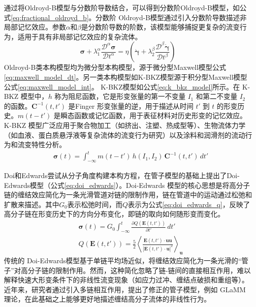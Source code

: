 通过将Oldroyd-B模型与分数阶导数结合，可以得到分数阶Oldroyd-B模型，如公式\eqref{eq:fractional_oldroyd_b}。分数阶 Oldroyd-B模型通过引入分数阶导数描述非局部记忆效应。参数$\alpha$和$\beta$是分数阶导数的阶数，该模型能够捕捉更复杂的流变行为，适用于具有非局部记忆效应的复杂流体。
\begin{equation}
	\boldsymbol{\sigma} + \lambda_1^\alpha \frac{\mathcal{D}^\alpha \boldsymbol{\sigma}}{\mathcal{D}t^\alpha} = \eta \left( \dot{\boldsymbol{\gamma}} + \lambda_2^\beta \frac{\mathcal{D}^\beta \dot{\boldsymbol{\gamma}}}{\mathcal{D}t^\beta} \right) \label{eq:fractional_oldroyd_b}
\end{equation}
Oldroyd-B类本构模型均为微分型本构模型，源于微分型Maxwell模型公式\eqref{eq:maxwell_model_dt}。另一类本构模型如K-BKZ模型源于积分型Maxwell模型公式\eqref{eq:maxwell_model_int}。
K-BKZ模型如公式\eqref{eq:k_bkz_model}所示。在 K-BKZ 模型中，$h$ 称为阻尼函数，它是形变张量的第一不变量 $I_1$ 和第二不变量 $I_2$ 的函数。$\mathbf{C}^{-1}(t,t')$ 是Finger 形变张量的逆，用于描述从时间 $t'$ 到 $t$ 的形变历史。$m(t-t')$ 是瞬态函数或记忆函数，用于表征材料对历史形变的记忆效应。K-BKZ 模型广泛应用于聚合物加工（如挤出、注塑、热成型等）、生物流体力学（如血液、蛋白质悬浮液等复杂流体的流变行为研究）以及涂料和润滑剂的流动行为和流变特性分析\cite{mitsoulis60YearsKayeBernstein2023}。
\begin{align}
	 & \boldsymbol{\sigma}(t)  = \int_{-\infty}^t m(t-t') \, h(I_1, I_2) \, \mathbf{C}^{-1}(t,t') \, dt'    \label{eq:k_bkz_model}
\end{align}

Doi和Edwards尝试从分子角度构建本构方程，在管子模型的基础上提出了Doi-Edwards模型（公式\eqref{eq:doi_edwards}）。Doi-Edwards 模型的核心思想是将高分子链的缠结效应简化为一条光滑管道对链的限制作用，链在管道中的运动通过松弛和扩散来描述。其中$G_0$表示松弛时间，而$Q$表示为公式\eqref{eq:doi_edwards_q}，反映了高分子链在形变历史下的方向分布变化，即链的取向如何随形变而变化。
\begin{align}
	 & \boldsymbol{\sigma}(t)  = G_0 \int_{-\infty}^t \frac{\partial Q(\mathbf{E}(t,t'))}{\partial t'} \, dt'    \label{eq:doi_edwards}                                                                  \\
	 & Q(\mathbf{E}(t,t'))     = \frac{5}{2} \left\langle \frac{\mathbf{E}(t,t') \cdot \mathbf{u} \mathbf{u}}{|\mathbf{E}(t,t') \cdot \mathbf{u}|^2} \right\rangle_{\mathbf{u}} \label{eq:doi_edwards_q}
\end{align}
传统的 Doi-Edwards模型基于单链平均场近似，将缠结效应简化为一条光滑的“管子”对高分子链的限制作用。然而，这种简化忽略了链-链间的直接相互作用，难以解释快速大形变条件下的非线性流变现象（如应力过冲、缠结点破损和重组等）。近年来，研究者通过引入多链相互作用，提出了修正的管子模型，例如 GLaMM 理论，在此基础之上能够更好地描述缠结高分子流体的非线性行为。

